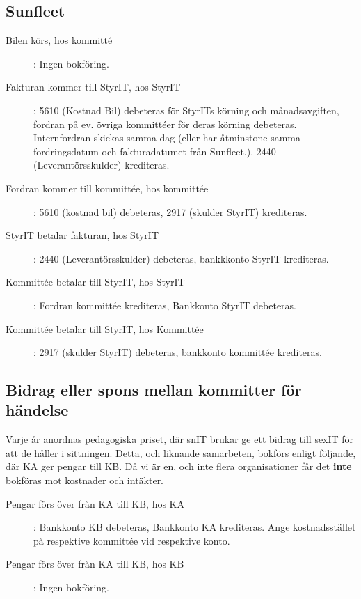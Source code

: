 \documentclass{article}
\begin{document}
\subsection{Sunfleet}
\begin{description}
    \item [Bilen körs, hos kommitté]: Ingen bokföring. 
    \item [Fakturan kommer till StyrIT, hos StyrIT]: 5610 (Kostnad Bil) debeteras för StyrITs körning och månadsavgiften, fordran på ev. övriga kommittéer för deras körning debeteras. Internfordran skickas samma dag (eller har åtminstone samma fordringsdatum och fakturadatumet från Sunfleet.). 2440 (Leverantörsskulder) krediteras.
    \item [Fordran kommer till kommittée, hos kommittée]: 5610 (kostnad bil) debeteras, 2917 (skulder StyrIT) krediteras.
    \item [StyrIT betalar fakturan, hos StyrIT]: 2440 (Leverantörsskulder) debeteras, bankkkonto StyrIT krediteras.
    \item[Kommittée betalar till StyrIT, hos StyrIT]: Fordran kommittée krediteras, Bankkonto StyrIT debeteras.
    \item[Kommittée betalar till StyrIT, hos Kommittée]: 2917 (skulder StyrIT) debeteras, bankkonto kommittée krediteras.
\end{description}


\subsection{Bidrag eller spons mellan kommitter för händelse}
Varje år anordnas pedagogiska priset, där snIT brukar ge ett bidrag till sexIT för att de håller i sittningen. Detta, och liknande samarbeten, bokförs enligt följande, där KA ger pengar till KB. Då vi är en, och inte flera organisationer får det \textbf{inte} bokföras mot kostnader och intäkter.  
\begin{description}
    \item [Pengar förs över från KA till KB, hos KA]: Bankkonto KB debeteras, Bankkonto KA krediteras. Ange kostnadsstället på respektive kommittée vid respektive konto.
    \item [Pengar förs över från KA till KB, hos KB]: Ingen bokföring. 
\end{description}
\end{document}
